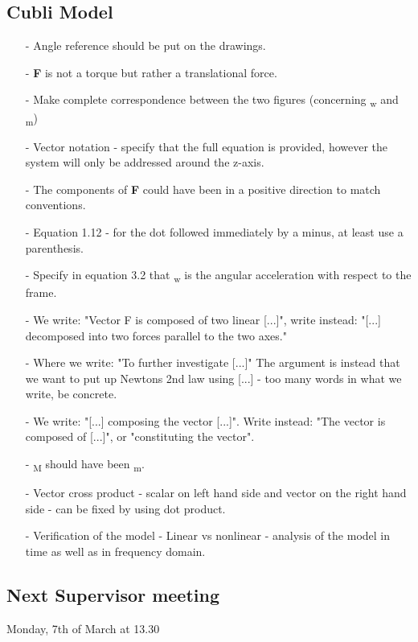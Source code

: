 \subsection{Cubli Model}
\begin{itemize}
\item[-] Angle reference should be put on the drawings.
\item[-] \textbf{F} is not a torque but rather a translational force.
\item[-] Make complete correspondence between the two figures (concerning \si{\tau_w} and \nolinebreak\si{\tau_m})
\item[-] Vector notation - specify that the full equation is provided, however the system will only be addressed around the z-axis.
\item[-] The components of \textbf{F} could have been in a positive direction to match conventions.
\item[-] Equation 1.12 - for the dot followed immediately by a minus, at least use a parenthesis.
\item[-] Specify in equation 3.2 that \si{\ddot{\theta}_w} is the angular acceleration with respect to the frame.
\item[-] We write: "Vector F is composed of two linear [...]", write instead: "[...] decomposed into two forces parallel to the two axes."
\item[-] Where we write: "To further investigate [...]" \si{\rightarrow} The argument is instead that we want to put up Newtons 2nd law using [...] - too many words in what we write, be concrete.
\item[-] We write: "[...] composing the vector [...]". Write instead: "The vector is composed of [...]", or "constituting the vector".
\item[-] \si{\tau_M} should have been \si{\tau_m}.
\item[-] Vector cross product - scalar on left hand side and vector on the right hand side - can be fixed by using dot product.
\item[-] Verification of the model - Linear vs nonlinear - analysis of the model in time as well as in frequency domain.
\end{itemize}

\subsection{Next Supervisor meeting}
Monday, 7th of March at 13.30











